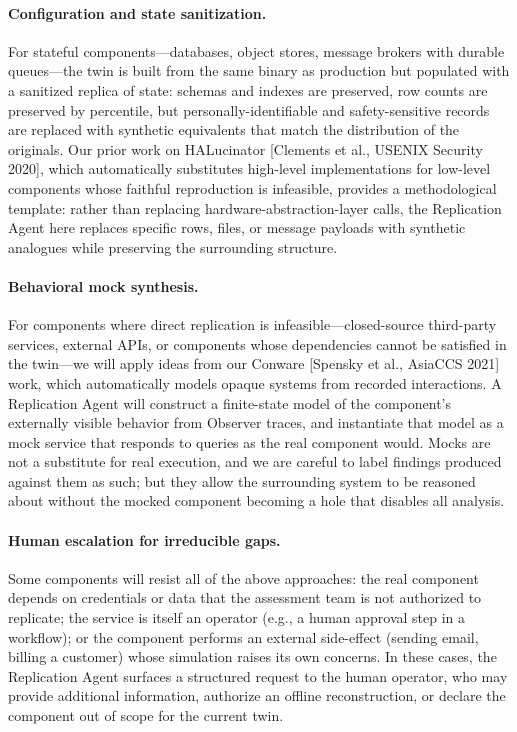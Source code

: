 \paragraph{Configuration and state sanitization.}
For stateful components---databases, object stores, message brokers
with durable queues---the twin is built from the same binary as
production but populated with a sanitized replica of state: schemas
and indexes are preserved, row counts are preserved by percentile, but
personally-identifiable and safety-sensitive records are replaced with
synthetic equivalents that match the distribution of the originals.
Our prior work on HALucinator [Clements et al., USENIX Security 2020],
which automatically substitutes high-level implementations for
low-level components whose faithful reproduction is infeasible, provides
a methodological template: rather than replacing hardware-abstraction-layer
calls, the Replication Agent here replaces specific rows, files, or
message payloads with synthetic analogues while preserving the
surrounding structure.

\paragraph{Behavioral mock synthesis.}
For components where direct replication is infeasible---closed-source
third-party services, external APIs, or components whose dependencies
cannot be satisfied in the twin---we will apply ideas from our
Conware [Spensky et al., AsiaCCS 2021] work, which automatically models
opaque systems from recorded interactions. A Replication Agent will
construct a finite-state model of the component's externally visible
behavior from Observer traces, and instantiate that model as a mock
service that responds to queries as the real component would. Mocks
are not a substitute for real execution, and we are careful to label
findings produced against them as such; but they allow the surrounding
system to be reasoned about without the mocked component becoming a
hole that disables all analysis.

\paragraph{Human escalation for irreducible gaps.}
Some components will resist all of the above approaches: the real
component depends on credentials or data that the assessment team is
not authorized to replicate; the service is itself an operator
(e.g., a human approval step in a workflow); or the component
performs an external side-effect (sending email, billing a customer)
whose simulation raises its own concerns. In these cases, the
Replication Agent surfaces a structured request to the human operator,
who may provide additional information, authorize an offline
reconstruction, or declare the component out of scope for the current
twin.

